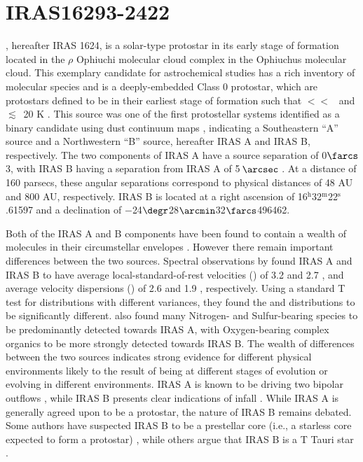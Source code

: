 \documentclass[iop,twocolappendix]{emulateapj}
\begin{document}
\section{IRAS16293-2422}
\label{sec:IRAS}

{\IRAS}, hereafter IRAS 1624, is a solar-type protostar in its early stage of formation located in the $\rho$ Ophiuchi molecular cloud complex in the Ophiuchus molecular cloud. This exemplary candidate for astrochemical studies has a rich inventory of molecular species \citep[e.g.,][]{Walker1986, Bisschop2008} and is a deeply-embedded Class 0 protostar, which are protostars defined to be in their earliest stage of formation such that {\Mstar} $<<$~{\Menv} and {\Td} $\lesssim$~20 K \citep{Andre1993}. This source was one of the first protostellar systems identified as a binary candidate using dust continuum maps \citep{Mundy1986}, indicating a Southeastern ``A'' source and a Northwestern ``B'' source, hereafter IRAS A and IRAS B, respectively. The two components of IRAS A have a source separation of 0$\farcs$3, with IRAS B having a separation from IRAS A of 5\,$\arcsec$ \citep{Mundy1986, Wootten1989}. At a distance of 160 parsecs, these angular separations correspond to physical distances of 48 AU and 800 AU, respectively. IRAS B is located at a right ascension of 16$^\mathrm{h}$32$^\mathrm{m}$22$^\mathrm{s}$.61597 and a declination of $-$24$\degr$28$\arcmin$32$\farcs$496462.

Both of the IRAS A and B components have been found to contain a wealth of molecules in their circumstellar envelopes \citep[e.g.,][]{Bisschop2008}. However there remain important differences between the two sources. Spectral observations by \citet{Jorgensen2011} found IRAS A and IRAS B to have average local-standard-of-rest velocities (\vLSR) of 3.2 {\kms} and 2.7 {\kms}, and average velocity dispersions (\dispersion) of 2.6 {\kms} and 1.9 {\kms}, respectively. Using a standard T test for distributions with different variances, they found the {\vLSR} and {\dispersion} distributions to be significantly different. \citeauthor{Jorgensen2011} also found many Nitrogen- and Sulfur-bearing species to be predominantly detected towards IRAS A, with Oxygen-bearing complex organics to be more strongly detected towards IRAS B. The wealth of differences between the two sources indicates strong evidence for different physical environments likely to the result of being at different stages of evolution or evolving in different environments. IRAS A is known to be driving two bipolar outflows \citep[see][]{Mundy1992, Walker1988}, while IRAS B presents clear indications of infall \citep[e.g.,][]{Pineda2012}. While IRAS A is generally agreed upon to be a protostar, the nature of IRAS B remains debated. Some authors have suspected IRAS B to be a prestellar core (i.e., a starless core expected to form a protostar) \citep{Chandler2005}, while others argue that IRAS B is a T Tauri star \citep{Stark2004}.
\end{document}
